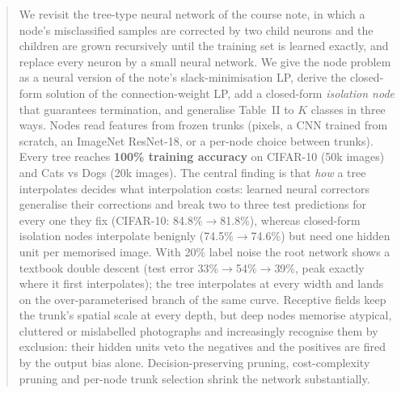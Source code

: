 \begin{abstract}\noindent
We revisit the tree-type neural network of the course note, in which a node's misclassified
samples are corrected by two child neurons and the children are grown recursively until the
training set is learned exactly, and replace every neuron by a small neural network. We give the
node problem as a neural version of the note's slack-minimisation LP, derive the closed-form solution
of the connection-weight LP, add a closed-form \emph{isolation node} that guarantees termination,
and generalise Table~II to $K$ classes in three ways. Nodes read features from frozen trunks
(pixels, a CNN trained from scratch, an ImageNet ResNet-18, or a per-node choice between trunks).
Every tree reaches \textbf{100\% training accuracy} on CIFAR-10 (50k images) and Cats vs Dogs (20k
images). The central finding is that \emph{how} a tree interpolates decides what interpolation costs:
learned neural correctors generalise their corrections and break two to three test predictions for
every one they fix (CIFAR-10: 84.8\%$\to$81.8\%), whereas closed-form isolation nodes interpolate
benignly (74.5\%$\to$74.6\%) but need one hidden unit per memorised image. With 20\% label noise the
root network shows a textbook double descent (test error 33\%$\to$54\%$\to$39\%, peak exactly where it
first interpolates); the tree interpolates at every width and lands on the over-parameterised branch
of the same curve. Receptive fields keep the trunk's spatial scale at every depth, but deep nodes memorise atypical,
cluttered or mislabelled photographs and increasingly recognise them by exclusion: their hidden units
veto the negatives and the positives are fired by the output bias alone. Decision-preserving pruning,
cost-complexity pruning and per-node trunk selection shrink the network substantially.
\end{abstract}
